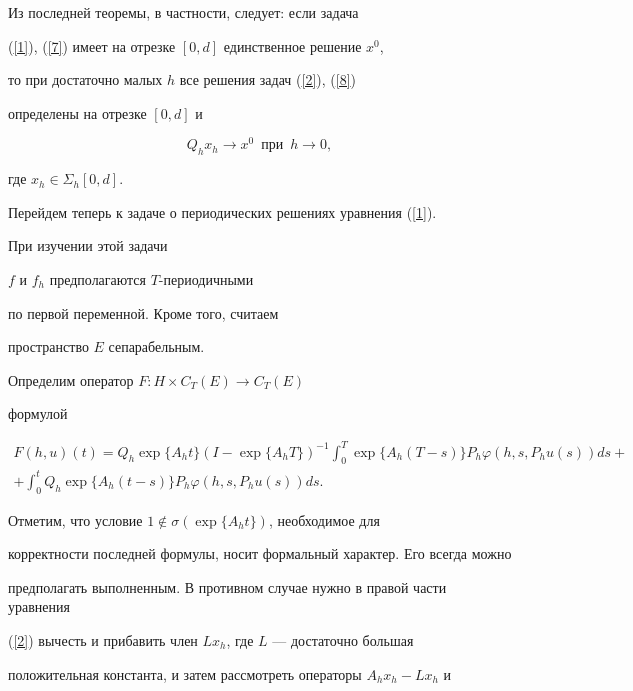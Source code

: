 Из последней теоремы, в частности, следует: если задача 


(\ref{1}), (\ref{7}) имеет на отрезке $[0,d]$ единственное решение $x^0$,


то при достаточно малых $h$ все решения задач (\ref{2}), (\ref{8})


определены на отрезке $[0,d]$ и


\begin{equation}\label{9''}


Q_hx_h \to x^0 \ \; \text{при} \ \; h\to 0,


\end{equation}


где $x_h\in \Sigma_h [0,d]$.





Перейдем теперь к задаче о периодических решениях уравнения (\ref{1}).


При изучении этой задачи 


$f$ и $f_h$ предполагаются $T$-периодичными


по первой переменной. Кроме того, считаем


пространство $E$ сепарабельным. 





Определим оператор $F : H\times C_T (E) \to C_T (E)$


формулой


\begin{multline}\label{10}


F(h,u)(t)=Q_h \exp\{A_ht\} (I- \exp\{A_hT\})^{-1} 


\int_0^T \exp\{A_h(T-s)\}P_h\varphi(h,s,P_hu(s))ds +\\


%


+\int_0^t Q_h\exp\{A_h(t-s)\}P_h\varphi(h,s,P_hu(s))ds.


\end{multline}


Отметим, что условие $1\notin \sigma(\exp\{A_ht \})$, необходимое для 


корректности последней формулы, носит формальный характер. Его всегда можно 


предполагать выполненным. В противном случае нужно в правой части уравнения


(\ref{2}) вычесть и прибавить член $Lx_h$, где $L$ --- достаточно большая


положительная константа, и затем рассмотреть операторы $A_hx_h -Lx_h$ и 


